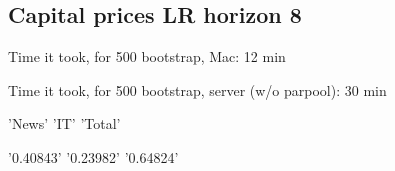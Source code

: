 \documentclass{article}
\def \ourFigPath {../}
\begin{document}




\newpage
\subsection{Capital prices LR horizon 8}
\noindent Time it took, for 500 bootstrap, Mac: 12 min

\noindent  Time it took, for 500 bootstrap, server (w/o parpool): 30 min


\noindent  'News'       'IT'        'Total' 

\noindent  '0.40843'    '0.23982'    '0.64824'




\begin{figure}[h!]
	\centering
	 \hspace{.2in%
	} 
\end{figure}
	
	
		
	
	
\end{document}
